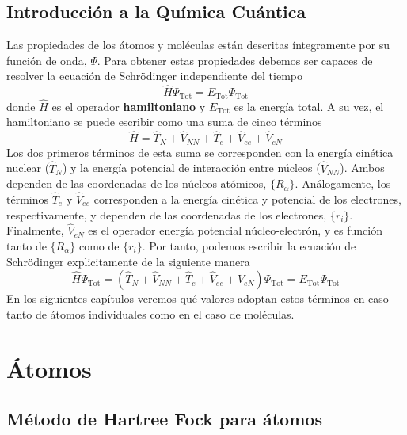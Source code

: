 \documentclass{tufte-book}
\begin{document}
\section{Introducción a la Química Cuántica}
Las propiedades de los átomos y moléculas están descritas
íntegramente por su función de onda, $\Psi$. Para obtener estas 
propiedades debemos ser capaces de resolver la ecuación 
de Schrödinger independiente del tiempo
\begin{equation}
    \hat{H}\Psi_\mathrm{Tot}=E_\mathrm{Tot}\Psi_\mathrm{Tot} 
\end{equation}
donde $\hat{H}$ es el operador \textbf{hamiltoniano} y
$E_\mathrm{Tot}$ es la energía total. A su vez, el 
hamiltoniano se puede escribir como una suma de cinco términos
\begin{equation}
    \hat{H} = \hat{T}_N + \hat{V}_{NN} + \hat{T}_e + \hat{V}_{ee} +\hat{V}_{eN}
\end{equation}
Los dos primeros términos de esta suma se corresponden con la 
energía cinética nuclear ($\hat{T}_N$) y la energía potencial de
interacción entre núcleos ($\hat{V}_{NN}$). Ambos dependen de las
coordenadas de los núcleos atómicos, $\{R_\alpha\}$. Análogamente, 
los términos $\hat{T}_e $ y $\hat{V}_{ee}$ corresponden a la 
energía cinética y potencial de los electrones, respectivamente, y
dependen de las coordenadas de los electrones, $\{r_i\}$.
Finalmente, $\hat{V}_{eN}$ es el operador energía potencial
núcleo-electrón, y es función tanto de $\{R_\alpha\}$ como de 
$\{r_i\}$. Por tanto, podemos escribir la ecuación de Schrödinger
explicitamente de la siguiente manera
\begin{equation}
    \hat{H}\Psi_\mathrm{Tot}   =
    (\hat{T}_N + \hat{V}_{NN} + \hat{T}_e + \hat{V}_{ee} +\hat{V}_{eN})\Psi_\mathrm{Tot} 
    = E_\mathrm{Tot}\Psi_\mathrm{Tot}
    \label{eq:hamilt_terms}
\end{equation}
En los siguientes capítulos veremos qué valores adoptan
estos términos en caso tanto de átomos individuales
como en el caso de moléculas.

\chapter{Átomos}
\section{Método de Hartree Fock para átomos}
\end{document}
